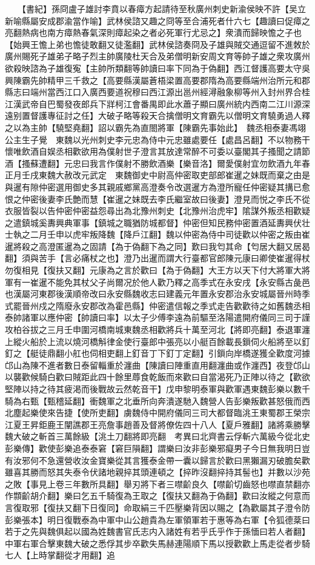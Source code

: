 　　【書紀】孫冏盧子雄討李賁以春瘴方起請待至秋廣州刺史新渝侯映不許【吴立新喻縣屬安成郡渝當作喻】武林侯諮又趣之冏等至合浦死者什六七【趣讀曰促瘴之亮翻熱病也南方瘴熱春氣深則瘴起染之者必死軍行尤忌之】衆潰而歸映憺之子也【始興王憺上弟也憺徒敢翻又徒濫翻】武林侯諮奏冏及子雄與賊交通逗留不進敇於廣州賜死子雄弟子略子烈主帥廣陵杜天合及弟僧明新安周文育等帥子雄之衆攻廣州欲殺映諮為子雄復寃【主帥所類翻等帥讀曰率下同為于偽翻】西江督護高要太守吳興陳霸先帥精甲三千救之【高要縣漢屬蒼梧梁置高要郡隋為高要縣端州治所元和郡縣志曰端州當西江口入廣西要道祝穆曰西江源出邕州經潯融象柳等州入封州界合桂江漢武帝自巴蜀發夜郎兵下牂柯江會番禺即此水蕭子顯曰廣州統内西南二江川源深遠别置督護專征討之任】大破子略等殺天合擒僧明文育霸先以僧明文育驍勇過人釋之以為主帥【驍堅堯翻】詔以霸先為直閤將軍【陳霸先事始此】　魏丞相泰妻馮翊公主生子覺　東魏以光州刺史李元忠為侍中元忠雖處要任【處昌呂翻】不以物務干懷唯飲酒自娱丞相歡欲用為僕射世子澄言其放達常醉不可委以臺閣其子搔聞之請節酒【搔蘇遭翻】元忠曰我言作僕射不勝飲酒樂【樂音洛】爾愛僕射宜勿飲酒九年春正月壬戌東魏大赦改元武定　東魏御史中尉高仲密取吏部郎崔暹之妹既而棄之由是與暹有隙仲密選用御史多其親戚鄉黨高澄奏令改選暹方為澄所寵任仲密疑其搆已愈恨之仲密後妻李氏艶而慧【崔暹之妹既去李氏繼室故曰後妻】澄見而悦之李氏不從衣服皆裂以告仲密仲密益怨尋出為北豫州刺史【北豫州治虎牢】隂謀外叛丞相歡疑之遣鎮城奚夀興典軍事【鎮城之職猶防城都督】仲密但知民務仲密置酒延夀興伏壮士執之二月壬申以虎牢叛降魏【降戶江翻】魏以仲密為侍中司徒歡以仲密之叛由崔暹將殺之高澄匿暹為之固請【為于偽翻下為之同】歎曰我匄其命【匄居大翻又居曷翻】須與苦手【言必痛杖之也】澄乃出暹而謂大行臺都官郎陳元康曰卿使崔暹得杖勿復相見【復扶又翻】元康為之言於歡曰【為于偽翻】大王方以天下付大將軍大將軍有一崔暹不能免其杖父子尚爾况於他人歡乃釋之高季式在永安戌【永安縣古彘邑也漢屬河東郡後漢順帝改曰永安縣魏收志曰建義元年置永安郡治永安城屬晉州時季式罷晉州戍之隋廢永安郡改為霍邑縣】仲密遣信報之季式走告歡歡待之如舊魏丞相泰帥諸軍以應仲密【帥讀曰率】以太子少傅李遠為前驅至洛陽遣開府儀同三司于謹攻柏谷拔之三月壬申圍河橋南城東魏丞相歡將兵十萬至河北【將即亮翻】泰退軍瀍上縱火船於上流以燒河橋斛律金使行臺郎中張亮以小艇百餘載長鎻伺火船將至以釘釘之【艇徒鼎翻小舡也伺相吏翻上釘音丁下釘丁定翻】引鎻向岸橋遂獲全歡度河據邙山為陳不進者數日泰留輜重於瀍曲【陳讀曰陣重直用翻瀍曲或作瀍西】夜登邙山以襲歡候騎白歡曰賊距此四十餘里蓐食乾飯而來歡曰自當渴死乃正陣以待之【歡欲堅陣以持之待其疲渇而後戰故云然乾音干】戊申黎明泰軍與歡軍遇東魏彭樂以數千騎為右甄【甄稽延翻】衝魏軍之北垂所向奔潰遂馳入魏營人告彭樂叛歡甚怒俄而西北塵起樂使來告捷【使所吏翻】虜魏侍中開府儀同三司大都督臨洮王東蜀郡王榮宗江夏王昇鉅鹿王闡譙郡王亮詹事趙善及督將僚佐四十八人【夏戶雅翻】諸將乘勝擊魏大破之斬首三萬餘級【洮土刀翻將即亮翻　考異曰北齊書云俘斬六萬級今從北史彭樂傳】歡使彭樂追泰泰窘【窘巨隕翻】謂樂曰汝非彭樂邪癡男子今日無我明日豈有汝邪何不急還營收汝金寶樂從其言獲泰金帶一囊以歸言於歡曰黑獺漏刃破膽矣歡雖喜其勝而怒其失泰令伏諸地親捽其頭連頓之【捽昨沒翻捽持其髻也】并數以沙苑之敗【事見上卷三年數所具翻】舉刃將下者三噤齘良久【噤齘切齒怒也噤直禁翻亦作䫴齘胡介翻】樂曰乞五千騎復為王取之【復扶又翻為于偽翻】歡曰汝縱之何意而言復取邪【復扶又翻下日復同】命取絹三千匹壓樂背因以賜之【為歡屬其子澄令防彭樂張本】明日復戰泰為中軍中山公趙貴為左軍領軍若于惠等為右軍【令狐德棻曰若于之先與魏俱起以國為姓魏書官氏志内入諸姓有若乎氏乎作于孫愐曰若人者翻】中軍右軍合擊東魏大破之悉俘其步卒歡失馬赫連陽順下馬以授歡歡上馬走從者步騎七人【上時掌翻從才用翻】追